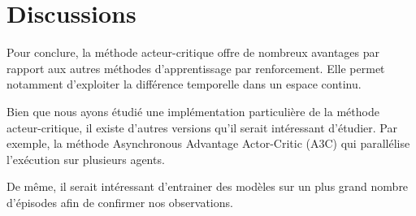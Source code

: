 \section{Discussions}

Pour conclure, la méthode acteur-critique offre de nombreux avantages par rapport aux autres méthodes d'apprentissage par renforcement. 
Elle permet notamment d'exploiter la différence temporelle dans un espace continu.

Bien que nous ayons étudié une implémentation particulière de la méthode acteur-critique,
il existe d'autres versions qu'il serait intéressant d'étudier.
Par exemple, la méthode Asynchronous Advantage Actor-Critic (A3C) qui parallélise l'exécution sur plusieurs agents.

De même, il serait intéressant d'entrainer des modèles sur un plus grand nombre d'épisodes afin de confirmer nos observations.
